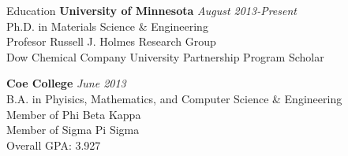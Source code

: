 \documentclass{resume} %
\begin{document}

\begin{rSection}{Education}
{\bf University of Minnesota} \hfill {\em August 2013-Present} \\
Ph.D. in Materials Science \& Engineering \\
Profesor Russell J. Holmes Research Group \\
Dow Chemical Company University Partnership Program Scholar

{\bf Coe College} \hfill {\em June 2013} \\ 
B.A. in Phyisics, Mathematics, and Computer Science \& Engineering \\
Member of Phi Beta Kappa\\
Member of Sigma Pi Sigma\\
Overall GPA: 3.927 

\end{rSection}

\end{document}
